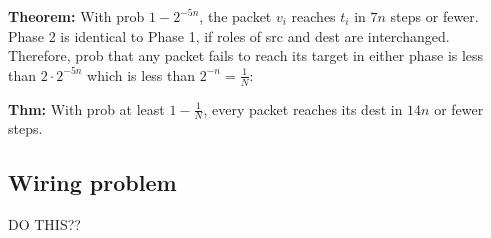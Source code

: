 \documentclass[a4paper]{article}
\begin{document}
\textbf{Theorem: } With prob $1-2^{-5n}$, the packet $v_i$ reaches $t_i$ in $7n$ steps or fewer.\\

Phase 2 is identical to Phase 1, if roles of src and dest are interchanged. Therefore, prob that any packet fails to reach its target in either phase is less than $2\cdot 2^{-5n}$ which is less than $2^{-n}=\frac{1}{N}$:

\textbf{Thm: } With prob at least $1-\frac{1}{N} $, every packet reaches its dest in $14n$ or fewer steps.
\subsection{Wiring problem}
DO THIS??
\end{document}
